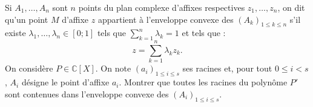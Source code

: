 \documentclass[a4paper,12pt]{article}
\begin{document}
\begin{tcolorbox}[title={Exercice 14 - {[}Représenter, Calculer, Chercher{]}}]
Si \( A_1, \dots, A_n \) sont \( n \) points du plan complexe d’affixes respectives \( z_1, \dots, z_n \), on dit qu’un point \( M \) d’affixe \( z \) appartient à l’enveloppe convexe des \((A_k)_{1 \leq k \leq n}\) s’il existe \( \lambda_1, \dots, \lambda_n \in [0;1] \) tels que \( \sum_{k=1}^{n} \lambda_k = 1 \) et tels que :
\[
z = \sum_{k=1}^{n} \lambda_k z_k.
\]
On considère \( P \in \mathbb{C}[X] \). On note \( (a_i)_{1 \leq i \leq s} \) ses racines et, pour tout \( 0 \leq i < s \), \( A_i \) désigne le point d’affixe \( a_i \). Montrer que toutes les racines du polynôme \( P' \) sont contenues dans l’enveloppe convexe des \( (A_i)_{1 \leq i \leq s} \).
\end{tcolorbox}
\end{document}
